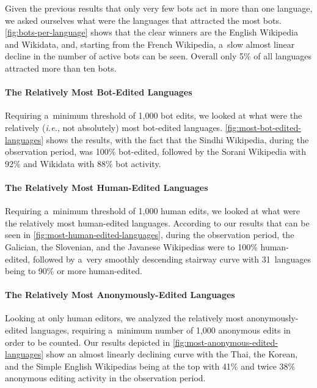 \documentclass{sig-alternate}
\begin{document}
Given the previous results that only very few bots
act in more than one language, we asked ourselves
what were the languages that attracted the most bots.
\autoref{fig:bots-per-language} shows that the clear winners
are the English Wikipedia and Wikidata,
and, starting from the French Wikipedia, a~slow almost linear decline
in the number of active bots can be seen.
Overall only 5\% of all languages attracted more than ten bots.

\paragraph{The Relatively Most Bot-Edited Languages}

Requiring a~minimum threshold of 1,000 bot edits,
we looked at what were the relatively
(\emph{i.e.}, not absolutely) most bot-edited languages.
\autoref{fig:most-bot-edited-languages} shows the results,
with the fact that the Sindhi Wikipedia,
during the observation period, was 100\% bot-edited,
followed by the Sorani Wikipedia with 92\%
and Wikidata with 88\% bot activity.

\paragraph{The Relatively Most Human-Edited Languages}

Requiring a~minimum threshold of 1,000 human edits,
we looked at what were the relatively
most human-edited languages.
According to our results that can be seen in \autoref{fig:most-human-edited-languages},
during the observation period,
the Galician, the Slovenian, and the Javanese Wikipedias
were to 100\% human-edited, followed by
a~very smoothly descending stairway curve
with 31~languages being to 90\% or more human-edited.

\paragraph{The Relatively Most Anonymously-Edited Languages}

Looking at only human editors, we analyzed the relatively
most anonymously-edited languages, requiring a~minimum
number of 1,000 anonymous edits in order to be counted.
Our results depicted in \autoref{fig:most-anonymous-edited-languages}
show an almost linearly declining curve with the Thai,
the Korean, and the Simple English Wikipedias being at the top
with 41\% and twice 38\% anonymous editing activity
in the observation period. 
\end{document}
